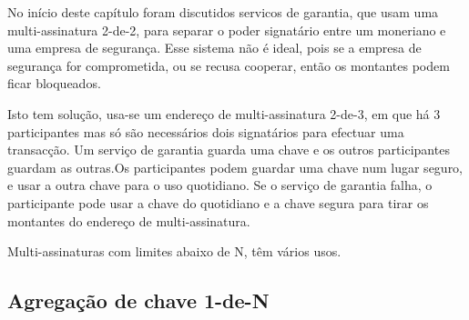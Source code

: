 No início deste capítulo foram discutidos servicos de garantia, que usam uma multi-assinatura 2-de-2, para separar o poder signatário entre um moneriano e uma empresa de segurança. Esse sistema não é ideal, pois se a empresa de segurança for comprometida, ou se recusa cooperar, então os montantes podem ficar bloqueados. 


Isto tem solução, usa-se um endereço de multi-assinatura 2-de-3, em que há 3 participantes mas só são necessários dois signatários para efectuar uma transacção. Um serviço de garantia guarda uma chave e os outros participantes guardam as outras.\newline Os participantes podem guardar uma chave num lugar seguro, e usar a outra chave para o uso quotidiano. Se o serviço de garantia falha, o participante pode usar a chave do quotidiano e a chave segura para tirar os montantes do endereço de multi-assinatura.   


Multi-assinaturas com limites abaixo de N, têm vários usos.


\subsection{Agregação de chave 1-de-N}
\label{sec:1-of-n}

